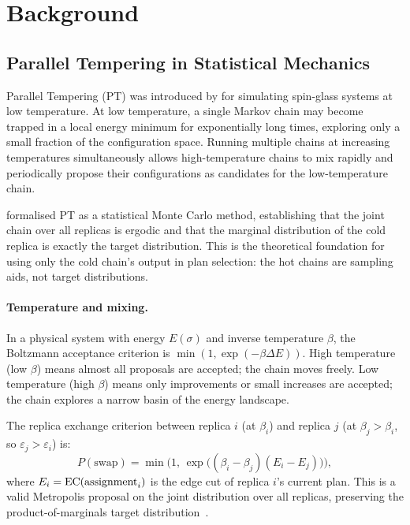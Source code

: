 \section{Background}
\label{sec:background}

\subsection{Parallel Tempering in Statistical Mechanics}

Parallel Tempering (PT) was introduced by \citet{swendsen1986} for simulating
spin-glass systems at low temperature.
At low temperature, a single Markov chain may become trapped in a local energy
minimum for exponentially long times, exploring only a small fraction of the
configuration space.
Running multiple chains at increasing temperatures simultaneously allows high-temperature
chains to mix rapidly and periodically propose their configurations as candidates
for the low-temperature chain.

\citet{geyer1991} formalised PT as a statistical Monte Carlo method,
establishing that the joint chain over all replicas is ergodic and that the
marginal distribution of the cold replica is exactly the target distribution.
This is the theoretical foundation for using only the cold chain's output in
plan selection: the hot chains are sampling aids, not target distributions.

\paragraph{Temperature and mixing.}
In a physical system with energy $E(\sigma)$ and inverse temperature $\beta$,
the Boltzmann acceptance criterion is $\min(1, \exp(-\beta \Delta E))$.
High temperature (low $\beta$) means almost all proposals are accepted;
the chain moves freely.
Low temperature (high $\beta$) means only improvements or small increases are
accepted; the chain explores a narrow basin of the energy landscape.

The replica exchange criterion between replica $i$ (at $\beta_i$) and replica
$j$ (at $\beta_j > \beta_i$, so $\varepsilon_j > \varepsilon_i$) is:
\[
  P(\text{swap}) = \min\!\bigl(1,\, \exp\bigl((\beta_i - \beta_j)(E_i - E_j)\bigr)\bigr),
\]
where $E_i = \mathrm{EC}(\text{assignment}_i)$ is the edge cut of replica $i$'s current
plan.
This is a valid Metropolis proposal on the joint distribution over all replicas,
preserving the product-of-marginals target distribution~\citep{geyer1991}.


